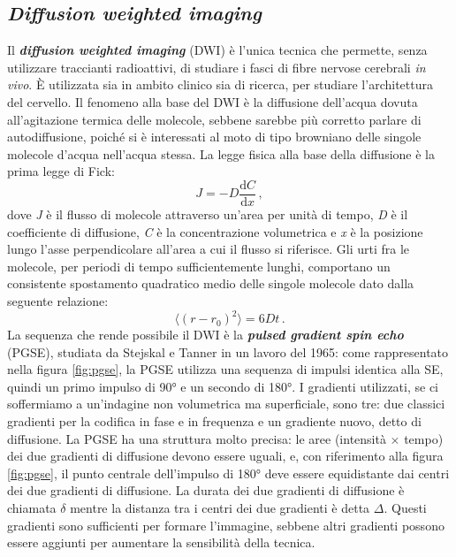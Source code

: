 \documentclass{report}
\newcommand{\figref}[1]{figura \ref{#1}}
\numberwithin{equation}{section}
\numberwithin{figure}{section}
\begin{document}
\subsection{\textit{Diffusion weighted imaging}}
Il \textbf{\textit{diffusion weighted imaging}} (DWI) è l'unica tecnica che permette, senza utilizzare traccianti radioattivi, di studiare i fasci di fibre nervose cerebrali \textit{in vivo}. È utilizzata sia in ambito clinico sia di ricerca, per studiare l'architettura del cervello. Il fenomeno alla base del DWI è la diffusione dell'acqua dovuta all'agitazione termica delle molecole, sebbene sarebbe più corretto parlare di autodiffusione, poiché si è interessati al moto di tipo browniano delle singole molecole d'acqua nell'acqua stessa. La legge fisica alla base della diffusione è la prima legge di Fick:
\begin{equation}
    J = -D \frac{\mathrm{d}C}{\mathrm{d}x}\,,
\end{equation}
dove \textit{J} è il flusso di molecole attraverso un'area per unità di tempo, \textit{D} è il coefficiente di diffusione, \textit{C} è la concentrazione volumetrica e \textit{x} è la posizione lungo l'asse perpendicolare all'area a cui il flusso si riferisce. Gli urti fra le molecole, per periodi di tempo sufficientemente lunghi, comportano un consistente spostamento quadratico medio delle singole molecole dato dalla seguente relazione:
\begin{equation}
    \langle (r-r_0)^2 \rangle = 6Dt\,.
\end{equation}
La sequenza che rende possibile il DWI è la \textbf{\textit{pulsed gradient spin echo}} (PGSE), studiata da Stejskal e Tanner in un lavoro del 1965: come rappresentato nella \figref{fig:pgse}, la PGSE utilizza una sequenza di impulsi identica alla SE, quindi un primo impulso di 90° e un secondo di 180°. I gradienti utilizzati, se ci soffermiamo a un'indagine non volumetrica ma superficiale, sono tre: due classici gradienti per la codifica in fase e in frequenza e un gradiente nuovo, detto di diffusione. La PGSE ha una struttura molto precisa: le aree (intensità $\times$ tempo) dei due gradienti di diffusione devono essere uguali, e, con riferimento alla \figref{fig:pgse}, il punto centrale dell'impulso di 180° deve essere equidistante dai centri dei due gradienti di diffusione. La durata dei due gradienti di diffusione è chiamata $\delta$ mentre la distanza tra i centri dei due gradienti è detta $\Delta$. Questi gradienti sono sufficienti per formare l'immagine, sebbene altri gradienti possono essere aggiunti per aumentare la sensibilità della tecnica.
\end{document}
